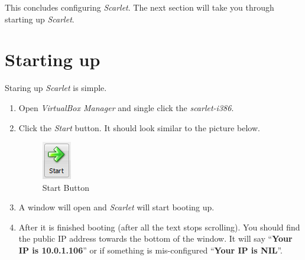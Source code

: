 \documentclass[pdftex,11pt,letterpaper]{article}
\begin{document}
This concludes configuring \textit{Scarlet}. The next section will take you through starting up \textit{Scarlet}.

\section{Starting up}

Staring up \textit{Scarlet} is simple.

\begin{enumerate}

\item Open \textit{VirtualBox Manager} and single click the \textit{scarlet-i386}.

\item Click the \textit{Start} button.  It should look similar to the picture below.

    \begin{figure}[H]
        \begin{center}
        \leavevmode
            \includegraphics[]{scarlet_images/start_button.png}
        \end{center}
        \caption{Start Button}
        \label{fig:start_button}
    \end{figure}
    
\item A window will open and \textit{Scarlet} will start booting up.

\item After it is finished booting (after all the text stops scrolling). You should find the public IP address towards the bottom of the window.  It will say ``\textbf{Your IP is 10.0.1.106}'' or if something is mis-configured ``\textbf{Your IP is NIL}''.


\end{enumerate}
\end{document}
